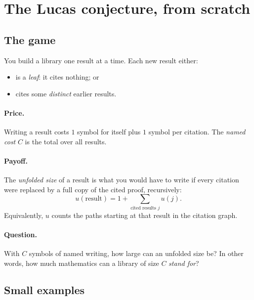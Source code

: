 \documentclass[11pt]{article}
\begin{document}
\section{The Lucas conjecture, from scratch}

\subsection{The game}

You build a library one result at a time. Each new result either:
\begin{itemize}
\item is a \emph{leaf}: it cites nothing; or
\item cites some \emph{distinct} earlier results.
\end{itemize}

\paragraph{Price.} Writing a result costs $1$ symbol for itself plus $1$ symbol per
citation. The \emph{named cost} $C$ is the total over all results.

\paragraph{Payoff.} The \emph{unfolded size} of a result is what you would have to write
if every citation were replaced by a full copy of the cited proof, recursively:
\[
u(\text{result}) = 1 + \sum_{\text{cited results } j} u(j).
\]
Equivalently, $u$ counts the paths starting at that result in the citation graph.

\paragraph{Question.} With $C$ symbols of named writing, how large can an unfolded
size be? In other words, how much mathematics can a library of size $C$ \emph{stand for}?

\subsection{Small examples}
\end{document}
